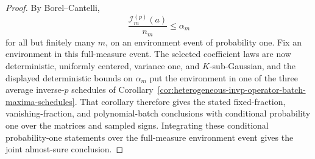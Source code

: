 \documentclass[11pt]{amsart}
\numberwithin{equation}{section}
\theoremstyle{definition}
\theoremstyle{remark}
\begin{document}
\begin{proof}
By Borel--Cantelli,
\[
  \frac{\mathcal I_m^{(p)}(a)}{n_m}\le \alpha_m
\]
for all but finitely many \(m\), on an environment event of probability one.
Fix an environment in this full-measure event.  The selected coefficient laws
are now deterministic, uniformly centered, variance one, and \(K\)-sub-Gaussian,
and the displayed deterministic bounds on \(\alpha_m\) put the environment in
one of the three average inverse-\(p\) schedules of
Corollary~\ref{cor:heterogeneous-invp-operator-batch-maxima-schedules}.  That
corollary therefore gives the stated fixed-fraction, vanishing-fraction, and
polynomial-batch conclusions with conditional probability one over the matrices
and sampled signs.  Integrating these conditional probability-one statements
over the full-measure environment event gives the joint almost-sure conclusion.
\end{proof}
\end{document}
